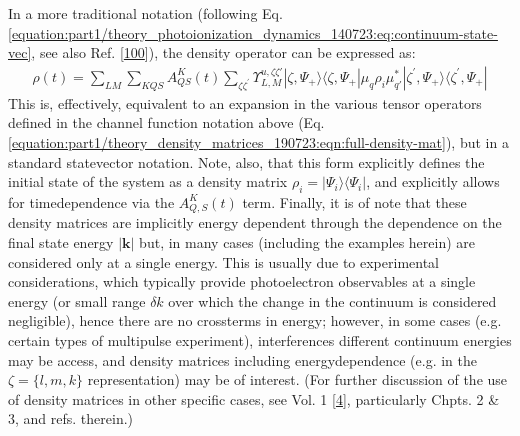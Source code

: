 \documentclass[letterpaper,table,10pt,english]{jupyterBook}
\begin{document}
\sphinxAtStartPar
In a more traditional notation (following Eq. \eqref{equation:part1/theory_photoionization_dynamics_140723:eq:continuum-state-vec}, see also Ref. {[}\hyperlink{cite.backmatter/bibliography:id637}{100}{]}), the density operator can be expressed as:
\begin{equation}\label{equation:part1/theory_density_matrices_190723:eqn:full-density-mat-traditional}
\begin{split}
\rho(t) =\sum_{LM}\sum_{KQS}A^{K}_{QS}(t)\sum_{\zeta\zeta^{\prime}}\varUpsilon_{L,M}^{u,\zeta\zeta'}|\zeta,\Psi_+\rangle\langle\zeta,\Psi_+|\mu_q\rho_i\mu_{q\prime}^{*}|\zeta^{\prime},\Psi_+\rangle\langle\zeta^{\prime},\Psi_+|
\end{split}
\end{equation}
\sphinxAtStartPar
This is, effectively, equivalent to an expansion in the various tensor operators defined in the channel function notation above (Eq. \eqref{equation:part1/theory_density_matrices_190723:eqn:full-density-mat}), but in a standard state\sphinxhyphen{}vector notation. Note, also, that this form explicitly defines the initial state of the system as a density matrix \(\rho_i = |\Psi_i\rangle\langle\Psi_i|\), and explicitly allows for time\sphinxhyphen{}dependence via the \(A_{Q,S}^{K}(t)\) term. Finally, it is of note that these density matrices are implicitly energy dependent through the dependence on the final state energy \(|\mathbf{k}|\) but, in many cases (including the examples herein) are considered only at a single energy. This is usually due to experimental considerations, which typically provide photoelectron observables at a single energy (or small range \(\delta k\) over which the change in the continuum is considered negligible), hence there are no cross\sphinxhyphen{}terms in energy; however, in some cases (e.g. certain types of multi\sphinxhyphen{}pulse experiment), interferences  different continuum energies may be access, and density matrices including energy\sphinxhyphen{}dependence (e.g. in the \(\zeta = \{l,m,k\}\) representation) may be of interest.
(For further discussion of the use of density matrices in other specific cases, see  Vol. 1 {[}\hyperlink{cite.backmatter/bibliography:id677}{4}{]}, particularly Chpts. 2 \& 3, and refs. therein.)
\end{document}
